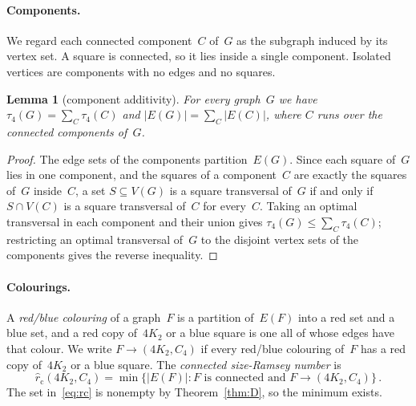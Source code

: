 \documentclass[11pt,letterpaper]{article}
\numberwithin{equation}{section}
\theoremstyle{plain}
\newtheorem{lemma}[theorem]{Lemma}
\theoremstyle{definition}
\theoremstyle{remark}
\newcommand{\rc}{\hat r_{\mathrm{c}}}
\begin{document}
\paragraph{Components.} We regard each connected component~$C$ of~$G$ as the subgraph induced by its vertex set. A square is connected, so it lies inside a single component. Isolated vertices are components with no edges and no squares.

\begin{lemma}[component additivity]\label{lem:components}
For every graph~$G$ we have \mbox{$\tau_4(G)=\sum_C\tau_4(C)$} and \mbox{$|E(G)|=\sum_C|E(C)|$}, where $C$ runs over the connected components of~$G$.
\end{lemma}

\begin{proof}
The edge sets of the components partition~$E(G)$. Since each square of~$G$ lies in one component, and the squares of a component~$C$ are exactly the squares of~$G$ inside~$C$, a set $S\subseteq V(G)$ is a square transversal of~$G$ if and only if $S\cap V(C)$ is a square transversal of~$C$ for every~$C$. Taking an optimal transversal in each component and their union gives $\tau_4(G)\le\sum_C\tau_4(C)$; restricting an optimal transversal of~$G$ to the disjoint vertex sets of the components gives the reverse inequality.
\end{proof}

\paragraph{Colourings.} A \emph{red/blue colouring} of a graph~$F$ is a partition of~$E(F)$ into a red set and a blue set, and a red copy of~$4K_2$ or a blue square is one all of whose edges have that colour. We write $F\to(4K_2,C_4)$ if every red/blue colouring of~$F$ has a red copy of~$4K_2$ or a blue square. The \emph{connected size-Ramsey number} is
\begin{equation}\label{eq:rc}
\rc(4K_2,C_4)=\min\{|E(F)| : F \text{ is connected and } F\to(4K_2,C_4)\}\,.
\end{equation}
The set in~\eqref{eq:rc} is nonempty by Theorem~\ref{thm:D}, so the minimum exists.
\end{document}
